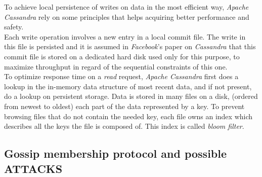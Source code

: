 \documentclass[a4paper]{report}
\newcommand{\ca}{\emph{Apache Cassandra\xspace}}
\begin{document}
To achieve local persistence of writes on data in the most efficient way, \ca{} rely on some principles that helps acquiring better performance and safety.\\
Each write operation involves a new entry in a local commit file. The write in this file is persisted and it is assumed in \emph{Facebook}'s paper on \emph{Cassandra} that this commit file is stored on a dedicated hard disk used only for this purpose, to maximize throughput in regard of the sequential constraints of this one.\\
To optimize response time on a \emph{read} request, \ca{} first does a lookup in the in-memory data structure of most recent data, and if not present, do a lookup on persistent storage. Data is stored in many files on a disk, (ordered from newest to oldest) each part of the data represented by a key. To prevent browsing files that do not contain the needed key, each file owns an index which describes all the keys the file is composed of. This index is called \emph{bloom filter}.


\subsection{Gossip membership protocol and possible ATTACKS} %
\label{sub:gossip_membership_protocol_and_potential_weaknesses}
\end{document}
